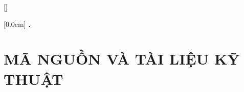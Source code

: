 \documentclass[a4paper,13pt,3p,oneside]{report}
\renewcommand{\bibname}{Danh_sach_tai_lieu_tham_khao}
\theoremstyle{definition}
\begin{document}
% 


\cleardoublepage
\renewcommand\bibname{TÀI LIỆU THAM KHẢO}
\nocite{*}
\printbibliography
{}

\appendixpage
\appendices
\addappheadtotoc


{}[]
\titlespacing*{\chapter}{0pt}{-20pt}{20pt}

    [0.0cm]             %
    {\bfseries\vspace{0.3cm}}                  %
    {{\bfseries{\scshape} \thecontentslabel.\ }} %
    {}         %
    {\contentspage}         %
\chapter{MÃ NGUỒN VÀ TÀI LIỆU KỸ THUẬT}

\label{phu-luc-a}


\end{document}
